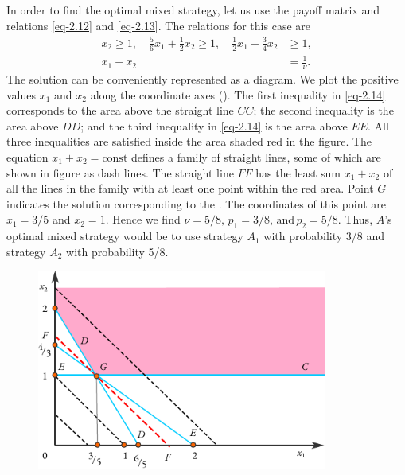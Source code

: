 In order to find the optimal mixed strategy, let us use the payoff
matrix and relations \eqref{eq-2.12} and \eqref{eq-2.13}. The relations for this case are
\begin{align}%
 x_{2} \geqslant 1, \quad \frac{5}{6}x_{1} + \frac{1}{2} x_{2}  \geqslant 1, \quad  \frac{1}{2}x_{1} + \frac{3}{4} x_{2} & \geqslant 1 \label{eq-2.14},\\
x_{1} + x_{2} & = \frac{1}{\nu}. \label{eq-2.15}
\end{align}
The solution can be conveniently represented as a diagram. We plot
the positive values $x_{1}$ and $x_{2}$ along the coordinate axes (). The first inequality in \eqref{eq-2.14} corresponds to the area above the straight line $CC$; the second inequality is the area above $DD$; and the third inequality in \eqref{eq-2.14} is the area above $EE$. All three inequalities are satisfied inside the area shaded red in the figure. The equation $x_{1} + x_{2} = \text{const}$ defines a family of straight lines, some of which are shown in figure as dash lines. The straight line $FF$ has the least sum $x_{1} + x_{2}$ of all the lines in the family with at least one point within the red area. Point
$G$ indicates the solution corresponding to the .
The coordinates of this point are  $x_{1} = 3/5$ and  $x_{2} = 1$. Hence we find
$\nu = 5/8, \, p_{1} = 3/8, \, \text{and} \, p_{2} = 5/8$. Thus, $A$'s optimal mixed strategy would be to use strategy $A_{1}$ with probability 3/8 and strategy $A_{2}$ with probability 5/8.
 \begin{figure}[!h]
 \centering
 \includegraphics[width=0.85\textwidth]{figures/aa-graph.pdf}
 \end{figure}

